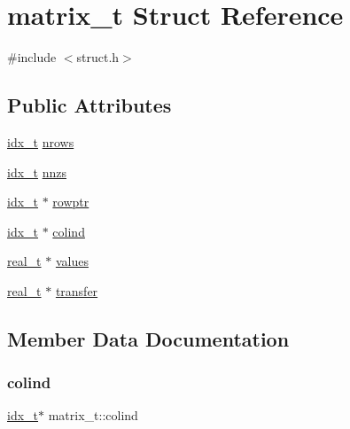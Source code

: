 \hypertarget{a00754}{}\section{matrix\+\_\+t Struct Reference}
\label{a00754}


{\ttfamily \#include $<$struct.\+h$>$}

\subsection*{Public Attributes}
\begin{DoxyCompactItemize}
\item 
\hyperlink{a00876_aaa5262be3e700770163401acb0150f52}{idx\+\_\+t} \hyperlink{a00754_ac20aa30eed145aeee3a266fbea756769}{nrows}
\item 
\hyperlink{a00876_aaa5262be3e700770163401acb0150f52}{idx\+\_\+t} \hyperlink{a00754_afd8bba971cd6b6099b02bc3bf5947dd3}{nnzs}
\item 
\hyperlink{a00876_aaa5262be3e700770163401acb0150f52}{idx\+\_\+t} $\ast$ \hyperlink{a00754_a824811193a913c152603e16be365dcca}{rowptr}
\item 
\hyperlink{a00876_aaa5262be3e700770163401acb0150f52}{idx\+\_\+t} $\ast$ \hyperlink{a00754_aab46086683162c3433675e82a035c322}{colind}
\item 
\hyperlink{a00876_a1924a4f6907cc3833213aba1f07fcbe9}{real\+\_\+t} $\ast$ \hyperlink{a00754_a9a918d16aa3d96259a8ff5491870685b}{values}
\item 
\hyperlink{a00876_a1924a4f6907cc3833213aba1f07fcbe9}{real\+\_\+t} $\ast$ \hyperlink{a00754_ae7a45331b8f617a43a9f244561b22191}{transfer}
\end{DoxyCompactItemize}


\subsection{Member Data Documentation}
\mbox{\label{a00754_aab46086683162c3433675e82a035c322}} 
\subsubsection{\texorpdfstring{colind}{colind}}
{\footnotesize\ttfamily \hyperlink{a00876_aaa5262be3e700770163401acb0150f52}{idx\+\_\+t}$\ast$ matrix\+\_\+t\+::colind}

